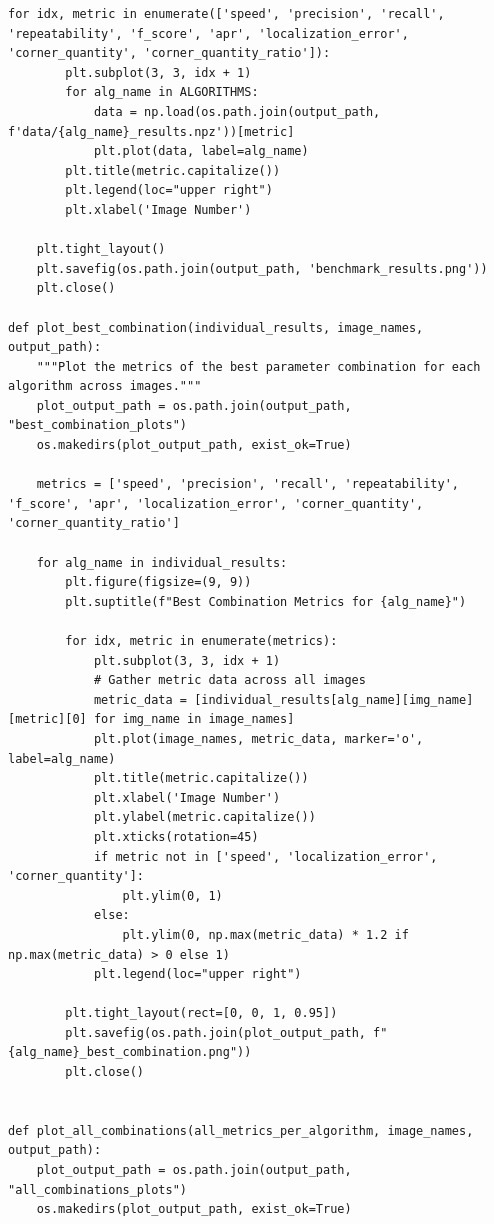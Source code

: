 \documentclass[journal]{IEEEtran}
\begin{document}
\begin{lstlisting}[style=python, caption={Utility Functions for Data Processing}, label={lst:utilities}]
    for idx, metric in enumerate(['speed', 'precision', 'recall', 'repeatability', 'f_score', 'apr', 'localization_error', 'corner_quantity', 'corner_quantity_ratio']):
        plt.subplot(3, 3, idx + 1)
        for alg_name in ALGORITHMS:
            data = np.load(os.path.join(output_path, f'data/{alg_name}_results.npz'))[metric]
            plt.plot(data, label=alg_name)
        plt.title(metric.capitalize())
        plt.legend(loc="upper right")
        plt.xlabel('Image Number')
    
    plt.tight_layout()
    plt.savefig(os.path.join(output_path, 'benchmark_results.png'))
    plt.close()

def plot_best_combination(individual_results, image_names, output_path):
    """Plot the metrics of the best parameter combination for each algorithm across images."""
    plot_output_path = os.path.join(output_path, "best_combination_plots")
    os.makedirs(plot_output_path, exist_ok=True)
    
    metrics = ['speed', 'precision', 'recall', 'repeatability', 'f_score', 'apr', 'localization_error', 'corner_quantity', 'corner_quantity_ratio']
    
    for alg_name in individual_results:
        plt.figure(figsize=(9, 9))
        plt.suptitle(f"Best Combination Metrics for {alg_name}")
        
        for idx, metric in enumerate(metrics):
            plt.subplot(3, 3, idx + 1)
            # Gather metric data across all images
            metric_data = [individual_results[alg_name][img_name][metric][0] for img_name in image_names]
            plt.plot(image_names, metric_data, marker='o', label=alg_name)
            plt.title(metric.capitalize())
            plt.xlabel('Image Number')
            plt.ylabel(metric.capitalize())
            plt.xticks(rotation=45)
            if metric not in ['speed', 'localization_error', 'corner_quantity']:
                plt.ylim(0, 1)
            else:
                plt.ylim(0, np.max(metric_data) * 1.2 if np.max(metric_data) > 0 else 1)
            plt.legend(loc="upper right")
        
        plt.tight_layout(rect=[0, 0, 1, 0.95])
        plt.savefig(os.path.join(plot_output_path, f"{alg_name}_best_combination.png"))
        plt.close()
        

def plot_all_combinations(all_metrics_per_algorithm, image_names, output_path):
    plot_output_path = os.path.join(output_path, "all_combinations_plots")
    os.makedirs(plot_output_path, exist_ok=True)
    

\end{lstlisting}
\end{document}
